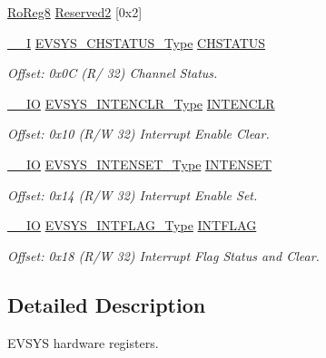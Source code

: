 \begin{DoxyCompactItemize}
\mbox{\hyperlink{group___s_a_m_d21_e15_a__definitions_ga0d957f1433aaf5d70e4dc2b68288442d}{Ro\+Reg8}} \mbox{\hyperlink{struct_evsys_a39c013121a741bab8d9442a891da19a7}{Reserved2}} \mbox{[}0x2\mbox{]}
\item 
\mbox{\hyperlink{core__cm0plus_8h_af63697ed9952cc71e1225efe205f6cd3}{\+\_\+\+\_\+I}} \mbox{\hyperlink{union_e_v_s_y_s___c_h_s_t_a_t_u_s___type}{E\+V\+S\+Y\+S\+\_\+\+C\+H\+S\+T\+A\+T\+U\+S\+\_\+\+Type}} \mbox{\hyperlink{struct_evsys_a95f2dc8fdc7b2c046428198d970b32cf}{C\+H\+S\+T\+A\+T\+US}}
\begin{DoxyCompactList}\small\item\em Offset\+: 0x0C (R/ 32) Channel Status. \end{DoxyCompactList}\item 
\mbox{\hyperlink{core__cm0plus_8h_aec43007d9998a0a0e01faede4133d6be}{\+\_\+\+\_\+\+IO}} \mbox{\hyperlink{union_e_v_s_y_s___i_n_t_e_n_c_l_r___type}{E\+V\+S\+Y\+S\+\_\+\+I\+N\+T\+E\+N\+C\+L\+R\+\_\+\+Type}} \mbox{\hyperlink{struct_evsys_af275bc7b2d0cf200c814dde1520d6b98}{I\+N\+T\+E\+N\+C\+LR}}
\begin{DoxyCompactList}\small\item\em Offset\+: 0x10 (R/W 32) Interrupt Enable Clear. \end{DoxyCompactList}\item 
\mbox{\hyperlink{core__cm0plus_8h_aec43007d9998a0a0e01faede4133d6be}{\+\_\+\+\_\+\+IO}} \mbox{\hyperlink{union_e_v_s_y_s___i_n_t_e_n_s_e_t___type}{E\+V\+S\+Y\+S\+\_\+\+I\+N\+T\+E\+N\+S\+E\+T\+\_\+\+Type}} \mbox{\hyperlink{struct_evsys_a13685bdf4d3dcde4c0edcc12c91efed3}{I\+N\+T\+E\+N\+S\+ET}}
\begin{DoxyCompactList}\small\item\em Offset\+: 0x14 (R/W 32) Interrupt Enable Set. \end{DoxyCompactList}\item 
\mbox{\hyperlink{core__cm0plus_8h_aec43007d9998a0a0e01faede4133d6be}{\+\_\+\+\_\+\+IO}} \mbox{\hyperlink{union_e_v_s_y_s___i_n_t_f_l_a_g___type}{E\+V\+S\+Y\+S\+\_\+\+I\+N\+T\+F\+L\+A\+G\+\_\+\+Type}} \mbox{\hyperlink{struct_evsys_af31a4852e80ca7c663830992615c584e}{I\+N\+T\+F\+L\+AG}}
\begin{DoxyCompactList}\small\item\em Offset\+: 0x18 (R/W 32) Interrupt Flag Status and Clear. \end{DoxyCompactList}\end{DoxyCompactItemize}


\subsection{Detailed Description}
E\+V\+S\+YS hardware registers. 

